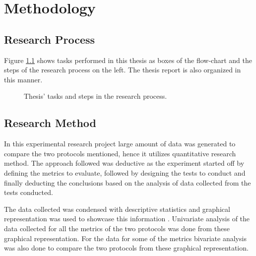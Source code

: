 \chapter{Methodology} \label{3Method}

\section{Research Process}
Figure \ref{RePrSteps} shows tasks performed in this thesis as boxes of the flow-chart and the steps of the research process on the left. The thesis report is also organized in this manner.
\vspace{10pt}

\begin{figure}[h]
\centering
\def\svgwidth{\columnwidth}

\caption{Thesis' tasks and steps in the research process.}
\label{RePrSteps}
\end{figure}

\section{Research Method}
In this experimental research project large amount of data was generated to compare the two protocols mentioned, hence it utilizes quantitative research method. The approach followed was deductive as the experiment started off by defining the metrics to evaluate, followed by designing the tests to conduct and finally deducting the conclusions based on the analysis of data collected from the tests conducted.

The data collected was condensed with descriptive statistics and graphical representation was used to showcase this information \cite{trochim2005research}. Univariate analysis of the data collected for all the metrics of the two protocols was done from these graphical representation. For the data for some of the metrics bivariate analysis was also done to compare the two protocols from these graphical representation.